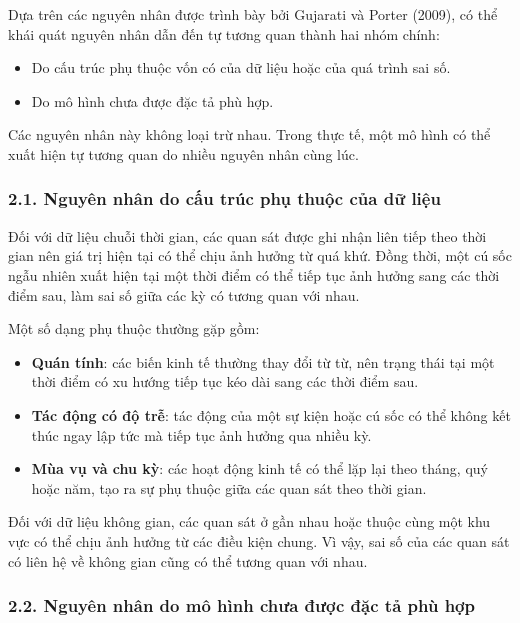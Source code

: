 Dựa trên các nguyên nhân được trình bày bởi Gujarati và Porter (2009), có thể khái quát nguyên nhân dẫn đến tự tương quan thành hai nhóm chính:

\begin{itemize}
    \item Do cấu trúc phụ thuộc vốn có của dữ liệu hoặc của quá trình sai số.
    \item Do mô hình chưa được đặc tả phù hợp.
\end{itemize}

Các nguyên nhân này không loại trừ nhau. Trong thực tế, một mô hình có thể xuất hiện tự tương quan do nhiều nguyên nhân cùng lúc.

\subsubsection{2.1. Nguyên nhân do cấu trúc phụ thuộc của dữ liệu}

Đối với dữ liệu chuỗi thời gian, các quan sát được ghi nhận liên tiếp theo thời gian nên giá trị hiện tại có thể chịu ảnh hưởng từ quá khứ. Đồng thời, một cú sốc ngẫu nhiên xuất hiện tại một thời điểm có thể tiếp tục ảnh hưởng sang các thời điểm sau, làm sai số giữa các kỳ có tương quan với nhau.

Một số dạng phụ thuộc thường gặp gồm:

\begin{itemize}
    \item \textbf{Quán tính}: các biến kinh tế thường thay đổi từ từ, nên trạng thái tại một thời điểm có xu hướng tiếp tục kéo dài sang các thời điểm sau.
    
    \item \textbf{Tác động có độ trễ}: tác động của một sự kiện hoặc cú sốc có thể không kết thúc ngay lập tức mà tiếp tục ảnh hưởng qua nhiều kỳ.
    
    \item \textbf{Mùa vụ và chu kỳ}: các hoạt động kinh tế có thể lặp lại theo tháng, quý hoặc năm, tạo ra sự phụ thuộc giữa các quan sát theo thời gian.
\end{itemize}

Đối với dữ liệu không gian, các quan sát ở gần nhau hoặc thuộc cùng một khu vực có thể chịu ảnh hưởng từ các điều kiện chung. Vì vậy, sai số của các quan sát có liên hệ về không gian cũng có thể tương quan với nhau.

\subsubsection{2.2. Nguyên nhân do mô hình chưa được đặc tả phù hợp}

